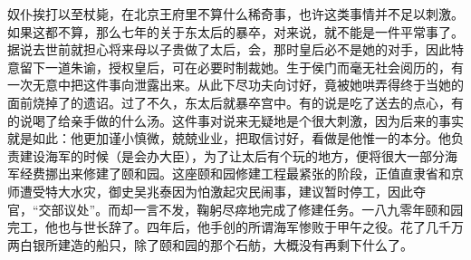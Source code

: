   奴仆挨打以至杖毙，在北京王府里不算什么稀奇事，也许这类事情并不足以刺激。如果这都不算，那么七年的关于东太后的暴卒，对来说，就不能是一件平常事了。据说去世前就担心将来母以子贵做了太后，会，那时皇后必不是她的对手，因此特意留下一道朱谕，授权皇后，可在必要时制裁她。生于侯门而毫无社会阅历的，有一次无意中把这件事向泄露出来。从此下尽功夫向讨好，竟被她哄弄得终于当她的面前烧掉了的遗诏。过了不久，东太后就暴卒宫中。有的说是吃了送去的点心，有的说喝了给亲手做的什么汤。这件事对说来无疑地是个很大刺激，因为后来的事实就是如此：他更加谨小慎微，兢兢业业，把取信讨好，看做是他惟一的本分。他负责建设海军的时候（是会办大臣），为了让太后有个玩的地方，便将很大一部分海军经费挪出来修建了颐和园。这座颐和园修建工程最紧张的阶段，正值直隶省和京师遭受特大水灾，御史吴兆泰因为怕激起灾民闹事，建议暂时停工，因此夺官，“交部议处”。而却一言不发，鞠躬尽瘁地完成了修建任务。一八九零年颐和园完工，他也与世长辞了。四年后，他手创的所谓海军惨败于甲午之役。花了几千万两白银所建造的船只，除了颐和园的那个石舫，大概没有再剩下什么了。
